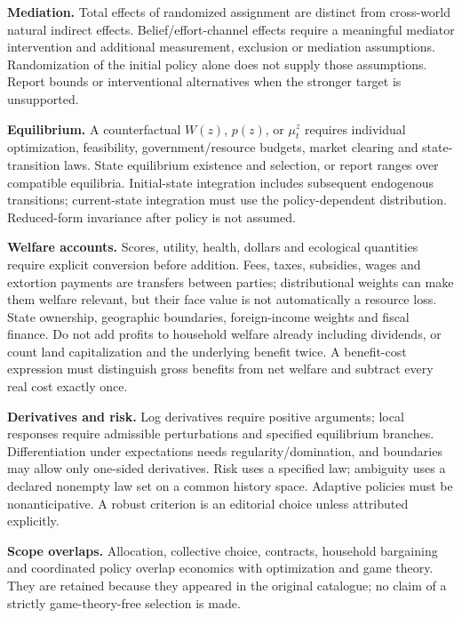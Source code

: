 \documentclass[11pt,a4paper]{article}
\begin{document}
\textbf{Mediation.} Total effects of randomized assignment are distinct from cross-world natural indirect effects. Belief/effort-channel effects require a meaningful mediator intervention and additional measurement, exclusion or mediation assumptions. Randomization of the initial policy alone does not supply those assumptions. Report bounds or interventional alternatives when the stronger target is unsupported.

\textbf{Equilibrium.} A counterfactual \(W(z)\), \(p(z)\), or \(\mu_t^z\) requires individual optimization, feasibility, government/resource budgets, market clearing and state-transition laws. State equilibrium existence and selection, or report ranges over compatible equilibria. Initial-state integration includes subsequent endogenous transitions; current-state integration must use the policy-dependent distribution. Reduced-form invariance after policy is not assumed.

\textbf{Welfare accounts.} Scores, utility, health, dollars and ecological quantities require explicit conversion before addition. Fees, taxes, subsidies, wages and extortion payments are transfers between parties; distributional weights can make them welfare relevant, but their face value is not automatically a resource loss. State ownership, geographic boundaries, foreign-income weights and fiscal finance. Do not add profits to household welfare already including dividends, or count land capitalization and the underlying benefit twice. A benefit-cost expression must distinguish gross benefits from net welfare and subtract every real cost exactly once.

\textbf{Derivatives and risk.} Log derivatives require positive arguments; local responses require admissible perturbations and specified equilibrium branches. Differentiation under expectations needs regularity/domination, and boundaries may allow only one-sided derivatives. Risk uses a specified law; ambiguity uses a declared nonempty law set on a common history space. Adaptive policies must be nonanticipative. A robust criterion is an editorial choice unless attributed explicitly.

\textbf{Scope overlaps.} Allocation, collective choice, contracts, household bargaining and coordinated policy overlap economics with optimization and game theory. They are retained because they appeared in the original catalogue; no claim of a strictly game-theory-free selection is made.
\end{document}
